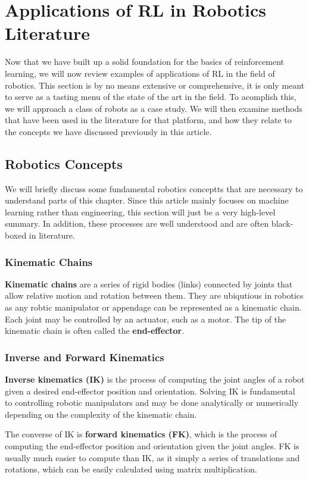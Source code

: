\documentclass[12pt]{report}
\theoremstyle{definition}
\theoremstyle{remark}
\begin{document}
\chapter{Applications of RL in Robotics Literature}
Now that we have built up a solid foundation for the basics of reinforcement learning, we will now review examples of applications of RL in the field of robotics. This section is by no means extensive or comprehensive, it is only meant to serve as a tasting menu of the state of the art in the field. To acomplish this, we will approach a class of robots as a case study. We will then examine methods that have been used in the literature for that platform, and how they relate to the concepts we have discussed previously in this article.

\section{Robotics Concepts}
We will briefly discuss some fundamental robotics conceptts that are necessary to understand parts of this chapter. Since this article mainly focuses on machine learning rather than engineering, this section will just be a very high-level summary. In addition, these processes are well understood and are often black-boxed in literature.

\subsection{Kinematic Chains}
\textbf{Kinematic chains} are a series of rigid bodies (links) connected by joints that allow relative motion and rotation between them. They are ubiqutious in robotics as any robtic manipulator or appendage can be represented as a kinematic chain. Each joint may be controlled by an actuator, such as a motor. The tip of the kinematic chain is often called the \textbf{end-effector}.

\subsection{Inverse and Forward Kinematics}
\textbf{Inverse kinematics (IK)} is the process of computing the joint angles of a robot given a desired end-effector position and orientation. Solving IK is fundamental to controlling robotic manipulators and may be done analytically or numerically depending on the complexity of the kinematic chain.

The converse of IK is \textbf{forward kinematics (FK)}, which is the process of computing the end-effector position and orientation given the joint angles. FK is usually much easier to compute than IK, as it simply a series of translations and rotations, which can be easily calculated using matrix multiplication.
\end{document}
